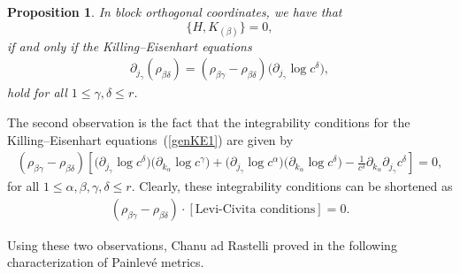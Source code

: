 \documentclass[11pt]{article}
\numberwithin{equation}{section}
\newtheorem{Proposition}[Theorem]{Proposition}
 { \theoremstyle{definition}
\newtheorem{Definition}[Theorem]{Definition}
\newtheorem{Example}[Theorem]{Example}
\newtheorem{Remark}[Theorem]{Remark} }
\newcommand{\kalpha}{k_{\alpha}}
\newcommand{\jgamma}{j_{\gamma}}
\begin{document}
\begin{Proposition}In block orthogonal coordinates, we have that
\[
 \big\{H,K_{(\beta)} \big\} = 0,
\]	
if and only if the Killing--Eisenhart equations
\begin{gather}\label{genKE1}
 \partial_{j_{\gamma}}(\rho_{ \beta \delta})= (\rho_{\beta \gamma} - \rho_{\beta \delta }) \big(\partial_{j_{\gamma}} \log c^\delta\big),
\end{gather}
hold for all $1 \leq \gamma, \delta \leq r$.
\end{Proposition}

The second observation is the fact that the integrability conditions for the Killing--Eisenhart equations~(\ref{genKE1}) are given by
\begin{gather*} %
 (\rho_{\beta \gamma} - \rho_{\beta \delta}) \left[ \big( \partial_{\jgamma} \log c^{\delta} \big) \big( \partial_{\kalpha} \log c^{\gamma}\big) + \big(\partial_{\jgamma} \log c^{\alpha} \big) \big( \partial_{\kalpha} \log c^{\delta} \big) - \frac{1}{c^{\delta}} \partial_{\kalpha}\partial_{\jgamma}c^{\delta} \right] = 0,
\end{gather*}
for all $1 \leq \alpha, \beta, \gamma, \delta \leq r$. Clearly, these integrability conditions can be shortened as
\begin{gather} \label{IC2}
 (\rho_{\beta \gamma} - \rho_{\beta \delta}) \cdot \left[ \textrm{Levi-Civita conditions} \right] = 0.
\end{gather}

Using these two observations, Chanu ad Rastelli proved in \cite[Proposition 5.5]{CR2019} the following characterization of Painlev\'e metrics.
\end{document}
